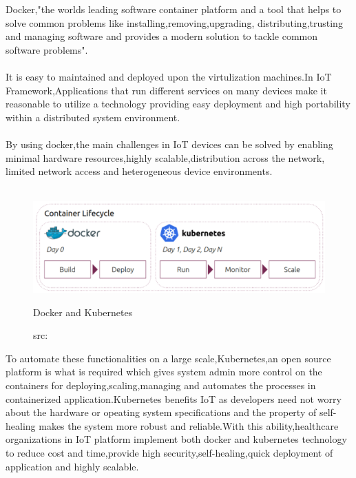 Docker,"the worlds leading software container platform and a tool that helps to solve common problems like installing,removing,upgrading,
distributing,trusting and managing software and provides a modern solution to tackle common software problems"\cite{7}.\\ \\
It is easy to maintained and deployed upon the virtulization machines.In IoT Framework,Applications that run different services on many devices make it reasonable to utilize a technology providing easy deployment and high portability within a distributed system environment\cite{7}.\\ \\
By using docker,the main challenges in IoT devices can be solved by enabling minimal hardware resources,highly scalable,distribution across the network,
limited network access and heterogeneous device environments.\\ \\
\begin{figure}[H]
	\centering
	\includegraphics[width=\linewidth]{image/dockub.png}
	\caption{Docker and Kubernetes}
	\caption*{src:\cite{kub}}
\end{figure}
To automate these functionalities on a large scale,Kubernetes,an open source platform is what is required which gives system admin more control on the containers for deploying,scaling,managing and automates the processes in containerized application.Kubernetes benefits IoT as developers need not worry about the hardware or opeating system specifications and the property of self-healing makes the system more robust and reliable.With this ability,healthcare organizations in IoT platform implement both docker and kubernetes technology to reduce cost and time,provide high security,self-healing,quick deployment of application and highly scalable.\\ \\



